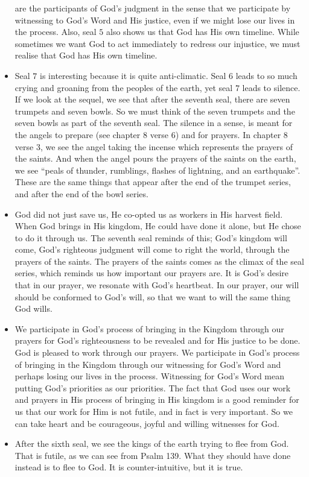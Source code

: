 \begin{itemize}
{  are the participants of God's judgment in the sense that we participate by
  witnessing to God's Word and His justice, even if we might lose our lives
  in the process.  Also, seal $5$ also shows us that God has His own
  timeline.  While sometimes we want God to act immediately to redress our
  injustice, we must realise that God has His own timeline.}
  \item{Seal $7$ is interesting because it is quite anti-climatic.  Seal $6$
  leads to so much crying and groaning from the peoples of the earth, yet
  seal $7$ leads to silence.  If we look at the sequel, we see that after the
  seventh seal, there are seven trumpets and seven bowls.  So we must think
  of the seven trumpets and the seven bowls as part of the seventh seal.  The
  silence in a sense, is meant for the angels to prepare (see chapter 8 verse
  6) and for prayers.  In chapter 8 verse 3, we see the angel taking the
  incense which represents the prayers of the saints.  And when the angel
  pours the prayers of the saints on the earth, we see ``peals of thunder,
  rumblings, flashes of lightning, and an earthquake''.  These are the same
  things that appear after the end of the trumpet series, and after the end
  of the bowl series. }
  \item{God did not just save us, He co-opted us as workers in His harvest
  field.  When God brings in His kingdom, He could have done it alone, but He
  chose to do it through us.  The seventh seal reminds of this; God's kingdom
  will come, God's righteous judgment will come to right the world, through
  the prayers of the saints.  The prayers of the saints comes as the climax
  of the seal series, which reminds us how important our prayers are.  It is
  God's desire that in our prayer, we resonate with God's heartbeat.  In our
  prayer, our will should be conformed to God's will, so that we want to will
  the same thing God wills.  }
  \item{We participate in God's process of bringing in the Kingdom through
  our prayers for God's righteousness to be revealed and for His justice to
  be done.  God is pleased to work through our prayers.  We participate in
  God's process of bringing in the Kingdom through our witnessing for God's
  Word and perhaps losing our lives in the process.  Witnessing for God's
  Word mean putting God's priorities as our priorities.  The fact that God
  uses our work and prayers in His process of bringing in His kingdom is a
  good reminder for us that our work for Him is not futile, and in fact is
  very important.  So we can take heart and be courageous, joyful and willing
  witnesses for God.}
  \item{After the sixth seal, we see the kings of the earth trying to flee
  from God.  That is futile, as we can see from Psalm 139.  What they should
  have done instead is to flee to God.  It is counter-intuitive, but it is
  true.}
\end{itemize}
